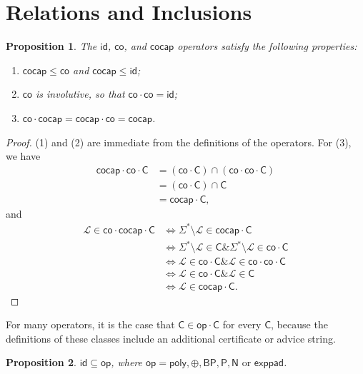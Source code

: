 \documentclass[12pt]{amsart}
\newtheorem*{proposition}{Proposition}
\theoremstyle{definition}
\theoremstyle{remark}
\newcommand{\cL}{\mathcal{L}}
\newcommand{\sC}{\mathsf{C}}
\newcommand{\co}{\mathsf{co}}
\newcommand{\cocap}{\mathsf{cocap}}
\newcommand{\sP}{\mathsf{P}}
\newcommand{\poly}{\mathsf{poly}}
\newcommand{\msf}[1]{\mathsf{#1}}
\newcommand{\id}{\msf{id}}
\newcommand{\AND}{\mathbin{\&}}
\newcommand{\op}{\msf{op}}
\newcommand{\sN}{\msf{N}}
\newcommand{\BP}{\msf{BP}}
\newcommand{\exppad}{\msf{exppad}}
\begin{document}
\section{Relations and Inclusions}

\begin{proposition}
  The $\id$, $\co$, and $\cocap$ operators satisfy the following properties:
  \begin{enumerate}
  \item $\cocap\leq\co$ and $\cocap\leq\id$;
  \item $\co$ is involutive, so that $\co\cdot\co=\id$;
  \item $\co\cdot\cocap=\cocap\cdot\co=\cocap$.
  \end{enumerate}
\end{proposition}

\begin{proof}
(1) and (2) are immediate from the definitions of the operators. For (3), we
have
\begin{align*}
\cocap\cdot\co\cdot\sC&=(\co\cdot\sC)\cap(\co\cdot\co\cdot\sC) \\
                      &=(\co\cdot\sC)\cap\sC \\
                      &=\cocap\cdot\sC,
\end{align*}
and
\begin{align*}
\cL\in\co\cdot\cocap\cdot\sC
&\Longleftrightarrow\Sigma^*\setminus\cL\in\cocap\cdot\sC \\
&\Longleftrightarrow\Sigma^*\setminus\cL\in\sC
\AND\Sigma^*\setminus\cL\in\co\cdot\sC \\
&\Longleftrightarrow\cL\in\co\cdot\sC\AND\cL\in\co\cdot\co\cdot\sC \\
&\Longleftrightarrow\cL\in\co\cdot\sC\AND\cL\in\sC \\
&\Longleftrightarrow\cL\in\cocap\cdot\sC.
\end{align*}
\end{proof}

For many operators, it is the case that $\sC\in\op\cdot\sC$ for every $\sC$,
because the definitions of these classes include an additional certificate or
advice string.

\begin{proposition}
$\id\subseteq\op$, where $\op=\poly,\oplus,\BP,\sP,\sN\text{ or }\exppad$.
\end{proposition}
\end{document}
